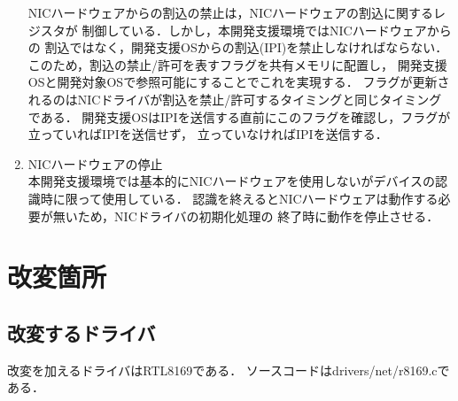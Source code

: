 \documentclass[12pt]{jsarticle}
\begin{document}
\begin{enumerate}
        NICハードウェアからの割込の禁止は，NICハードウェアの割込に関するレジスタが
        制御している．しかし，本開発支援環境ではNICハードウェアからの
        割込ではなく，開発支援OSからの割込(IPI)を禁止しなければならない．
        このため，割込の禁止/許可を表すフラグを共有メモリに配置し，
        開発支援OSと開発対象OSで参照可能にすることでこれを実現する．
        フラグが更新されるのはNICドライバが割込を禁止/許可するタイミングと同じタイミングである．
        開発支援OSはIPIを送信する直前にこのフラグを確認し，フラグが立っていればIPIを送信せず，
        立っていなければIPIを送信する．
    \item NICハードウェアの停止\\
        本開発支援環境では基本的にNICハードウェアを使用しないがデバイスの認識時に限って使用している．
        認識を終えるとNICハードウェアは動作する必要が無いため，NICドライバの初期化処理の
        終了時に動作を停止させる．
\end{enumerate}

\section{改変箇所}\label{kaihenkasyo}
\subsection{改変するドライバ}
改変を加えるドライバはRTL8169である．
ソースコードはdrivers/net/r8169.cである．
\end{document}
